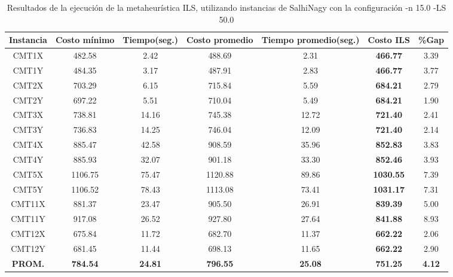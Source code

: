 \begin{table}[ht]
\caption{Resultados de la ejecución de la metaheurística ILS, utilizando instancias de SalhiNagy con la configuración -n 15.0 -LS 50.0}
\centering
\small
\begin{tabular}{c c c c c c c}
\hline\hline
Instancia & Costo mínimo & Tiempo(seg.) & Costo promedio & Tiempo promedio(seg.) & Costo ILS & \%Gap \\ [0.5ex]
\hline
CMT1X & 482.58 & 2.42 & 
488.69 & 2.31 & \bf{466.77} & 
3.39\\CMT1Y & 484.35 & 3.17 & 
487.91 & 2.83 & \bf{466.77} & 
3.77\\CMT2X & 703.29 & 6.15 & 
715.84 & 5.59 & \bf{684.21} & 
2.79\\CMT2Y & 697.22 & 5.51 & 
710.04 & 5.49 & \bf{684.21} & 
1.90\\CMT3X & 738.81 & 14.16 & 
745.38 & 12.72 & \bf{721.40} & 
2.41\\CMT3Y & 736.83 & 14.25 & 
746.04 & 12.09 & \bf{721.40} & 
2.14\\CMT4X & 885.47 & 42.58 & 
908.59 & 35.96 & \bf{852.83} & 
3.83\\CMT4Y & 885.93 & 32.07 & 
901.18 & 33.30 & \bf{852.46} & 
3.93\\CMT5X & 1106.75 & 75.47 & 
1120.88 & 89.86 & \bf{1030.55} & 
7.39\\CMT5Y & 1106.52 & 78.43 & 
1113.08 & 73.41 & \bf{1031.17} & 
7.31\\CMT11X & 881.37 & 23.47 & 
905.50 & 26.91 & \bf{839.39} & 
5.00\\CMT11Y & 917.08 & 26.52 & 
927.80 & 27.64 & \bf{841.88} & 
8.93\\CMT12X & 675.84 & 11.72 & 
682.70 & 11.37 & \bf{662.22} & 
2.06\\CMT12Y & 681.45 & 11.44 & 
698.13 & 11.65 & \bf{662.22} & 
2.90\\\bf{PROM.} & 
\bf{784.54} & \bf{24.81} & \bf{796.55} & \bf{25.08} & \bf{751.25} & \bf{4.12}\\[1ex]\hline
\end{tabular}
\label{table:nonlin}
\end{table} \clearpage
